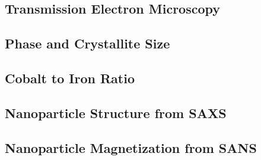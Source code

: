 \documentclass[\main/dresen_thesis.tex]{subfiles}
\renewcommand{\thisPath}{\main/chapters/monolayers/nanoparticles/}
\begin{document}
  \label{sec:monolayers:nanoparticles}

  \subsection{Transmission Electron Microscopy}
    
      \FloatBarrier

  \subsection{Phase and Crystallite Size}
  
    \FloatBarrier

  \subsection{Cobalt to Iron Ratio}
  
    \FloatBarrier

  \subsection{Nanoparticle Structure from SAXS}
  
    \FloatBarrier

  \subsection{Nanoparticle Magnetization from SANS}
  
    \FloatBarrier
\end{document}
